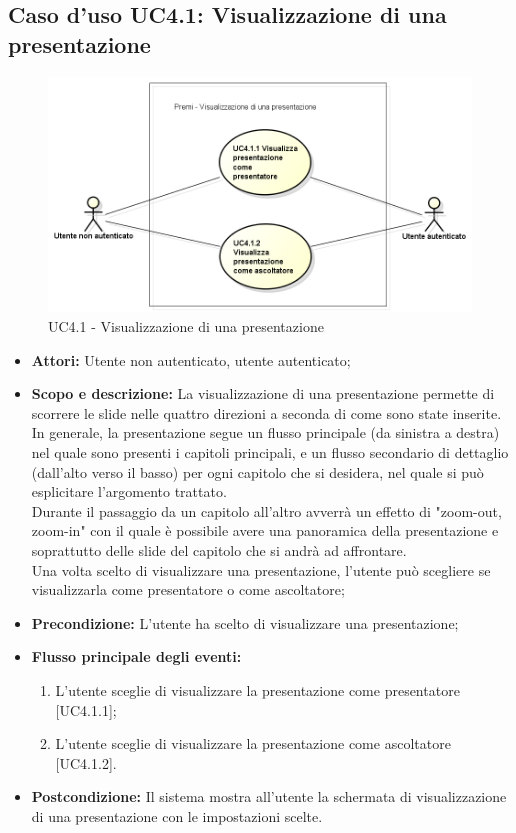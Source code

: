 \subsection{Caso d'uso UC4.1: Visualizzazione di una presentazione}
\begin{figure}[h] 
	\centering 
	\includegraphics[scale=0.45] {img/UC4.1.png} 
	\caption{UC4.1 - Visualizzazione di una presentazione} 
\end{figure}

\begin{itemize}
	\item \textbf{Attori:} Utente non autenticato, utente autenticato;
	\item \textbf{Scopo e descrizione:} La visualizzazione di una presentazione permette di scorrere le slide nelle quattro direzioni a seconda di come sono state inserite. In generale, la presentazione segue un flusso principale (da sinistra a destra) nel quale sono presenti i capitoli principali, e un flusso secondario di dettaglio (dall'alto verso il basso) per ogni capitolo che si desidera, nel quale si può esplicitare l'argomento trattato.\\
	Durante il passaggio da un capitolo all'altro avverrà un effetto di "zoom-out, zoom-in" con il quale è possibile avere una panoramica della presentazione e soprattutto delle slide del capitolo che si andrà ad affrontare.\\
	Una volta scelto di visualizzare una presentazione, l'utente può scegliere se visualizzarla come presentatore o come ascoltatore;
	\item \textbf{Precondizione:} L'utente ha scelto di visualizzare una presentazione;
	\item \textbf{Flusso principale degli eventi:}
	\begin{enumerate}
		\item L'utente sceglie di visualizzare la presentazione come presentatore [UC4.1.1];
		\item L'utente sceglie di visualizzare la presentazione come ascoltatore [UC4.1.2].
	\end{enumerate}
	\item \textbf{Postcondizione:} Il sistema mostra all'utente la schermata di visualizzazione di una presentazione con le impostazioni scelte.
\end{itemize}

